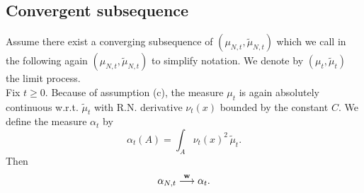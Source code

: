 \documentclass[a4paper,twoside,11pt]{article}
\theoremstyle{plain}
\theoremstyle{definition}
\theoremstyle{remark}
\newcommand\R{\mathbb R}         %
\begin{document}
%
\subsection{Convergent subsequence}

Assume there exist a converging subsequence of $(\mu_{N,t}, \tilde{\mu}_{N,t})$ which we call in the following again $(\mu_{N,t}, \tilde{\mu}_{N,t})$ to simplify notation. We denote by $(\mu_t, \tilde{\mu}_t)$ the limit process.\\ 

Fix $t\geq0.$ Because of assumption (c), the measure $\mu_t$ is again absolutely continuous w.r.t. $\tilde{\mu}_t$ with R.N. derivative $\nu_t(x)$ bounded by the constant $C.$ We define the measure $\alpha_t$ by 
$$\alpha_t(A) = \int_A \nu_t(x)^2 \,\tilde{\mu}_t.$$ 
Then
$$ \alpha_{N,t} \overset{\bold w}{\longrightarrow} \alpha_t. $$
\end{document}
